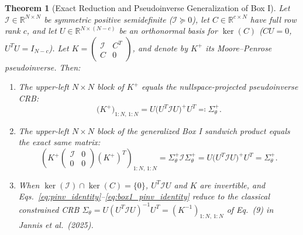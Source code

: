 \documentclass[11pt,a4paper]{article}
\theoremstyle{plain}
\newtheorem{theorem}{Theorem}[section]
\theoremstyle{definition}
\theoremstyle{remark}
\newcommand{\R}{\mathbb{R}}
\newcommand{\cI}{\mathcal{I}}
\newcommand{\pinv}{^{+}}
\begin{document}
\begin{theorem}[Exact Reduction and Pseudoinverse Generalization of Box I]
\label{thm:box1_pinv}
Let $\cI \in \R^{N \times N}$ be symmetric positive semidefinite ($\cI \succeq 0$), let $C \in \R^{c \times N}$ have full row rank $c$, and let $U \in \R^{N \times (N-c)}$ be an orthonormal basis for $\ker(C)$ ($CU = 0$, $U^T U = I_{N-c}$). Let $K = \begin{pmatrix} \cI & C^T \\ C & 0 \end{pmatrix}$, and denote by $K\pinv$ its Moore--Penrose pseudoinverse. Then:
\begin{enumerate}[leftmargin=1.5em]
    \item The upper-left $N \times N$ block of $K\pinv$ equals the nullspace-projected pseudoinverse CRB:
    \begin{equation}
    \label{eq:pinv_identity}
    \big(K\pinv\big)_{1:N,\, 1:N} = U \big( U^T \cI U \big)\pinv U^T \eqqcolon \Sigma_\theta\pinv.
    \end{equation}
    \item The upper-left $N \times N$ block of the generalized Box I sandwich product equals the exact same matrix:
    \begin{equation}
    \label{eq:box1_pinv_identity}
    \left( K\pinv \begin{pmatrix} \cI & 0 \\ 0 & 0 \end{pmatrix} (K\pinv)^T \right)_{1:N,\, 1:N} = \Sigma_\theta\pinv \cI \Sigma_\theta\pinv = U \big( U^T \cI U \big)\pinv U^T = \Sigma_\theta\pinv.
    \end{equation}
    \item When $\ker(\cI) \cap \ker(C) = \{0\}$, $U^T \cI U$ and $K$ are invertible, and Eqs.~\eqref{eq:pinv_identity}--\eqref{eq:box1_pinv_identity} reduce to the classical constrained CRB $\Sigma_\theta = U(U^T \cI U)^{-1} U^T = (K^{-1})_{1:N,\,1:N}$ of Eq.~(9) in Jannis et al.\ (2025).
\end{enumerate}
\end{theorem}
\end{document}
